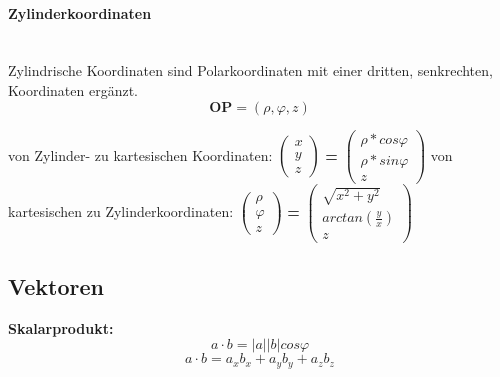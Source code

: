 \documentclass[7pt]{article}
\begin{document}
\begin{multicols}{3}
\paragraph{Zylinderkoordinaten}

\mbox{}\\ Zylindrische Koordinaten sind Polarkoordinaten mit einer dritten, senkrechten, Koordinaten ergänzt. 
\begin{equation}
	\textbf{OP} = (\rho, \varphi, z)
\end{equation}

von Zylinder- zu kartesischen Koordinaten:
\newline 
$\begin{pmatrix} 
	x \\ y \\ z 
\end{pmatrix} $ 
\textbf{=}
$\begin{pmatrix}
	\rho*cos\varphi \\ \rho*sin\varphi \\ z
\end{pmatrix}$
\newline
\newline
\newline von kartesischen zu Zylinderkoordinaten:
\newline $\begin{pmatrix} 
	\rho \\ \varphi \\ z 
\end{pmatrix} $ 
\textbf{=}
$\begin{pmatrix}
	\sqrt{x^{2}+ y^{2}} \\ arctan(\frac{y}{x}) \\ z
\end{pmatrix}$



\subsection{Vektoren}

\mbox{}
\textbf{Skalarprodukt:} \begin{equation}
	a \cdot b = |a||b| cos\varphi
\end{equation}
\begin{equation}
	a \cdot b = a_{x} b_{x} + a_{y} b_{y} + a_{z} b_{z}	
\end{equation}


\end{multicols}
\end{document}
